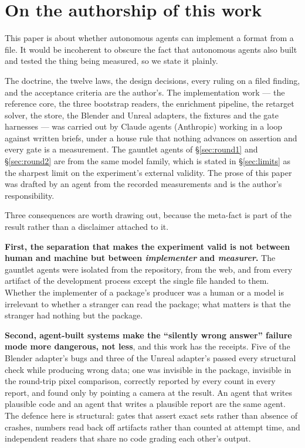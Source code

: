 \documentclass[10pt,twocolumn,letterpaper]{article}
\begin{document}
\section{On the authorship of this work}
\label{sec:disclosure}

This paper is about whether autonomous agents can implement a format from a file.
It would be incoherent to obscure the fact that autonomous agents also built and
tested the thing being measured, so we state it plainly.

The doctrine, the twelve laws, the design decisions, every ruling on a filed
finding, and the acceptance criteria are the author's. The implementation work ---
the reference core, the three bootstrap readers, the enrichment pipeline, the
retarget solver, the store, the Blender and Unreal adapters, the fixtures and the
gate harnesses --- was carried out by Claude agents (Anthropic) working in a loop
against written briefs, under a house rule that nothing advances on assertion and
every gate is a measurement. The gauntlet agents of \S\ref{sec:round1} and
\S\ref{sec:round2} are from the same model family, which is stated in
\S\ref{sec:limits} as the sharpest limit on the experiment's external validity.
The prose of this paper was drafted by an agent from the recorded measurements and
is the author's responsibility.

Three consequences are worth drawing out, because the meta-fact is part of the
result rather than a disclaimer attached to it.

\textbf{First, the separation that makes the experiment valid is not between human
and machine but between \emph{implementer} and \emph{measurer}.} The gauntlet
agents were isolated from the repository, from the web, and from every artifact of
the development process except the single file handed to them. Whether the
implementer of a package's producer was a human or a model is irrelevant to
whether a stranger can read the package; what matters is that the stranger had
nothing but the package.

\textbf{Second, agent-built systems make the ``silently wrong answer'' failure mode
more dangerous, not less}, and this work has the receipts. Five of the Blender
adapter's bugs and three of the Unreal adapter's passed every structural check
while producing wrong data; one was invisible in the package, invisible in the
round-trip pixel comparison, correctly reported by every count in every report,
and found only by pointing a camera at the result. An agent that writes plausible
code and an agent that writes a plausible report are the same agent. The defence
here is structural: gates that assert exact sets rather than absence of crashes,
numbers read back off artifacts rather than counted at attempt time, and
independent readers that share no code grading each other's output.
\end{document}
